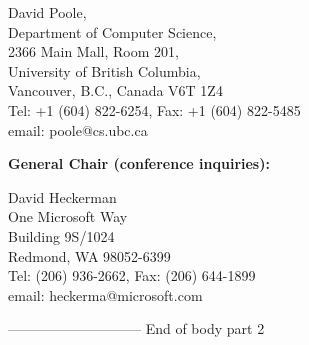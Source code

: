 David Poole,\\
Department of Computer Science,\\
2366 Main Mall, Room 201,\\
University of British Columbia,\\
Vancouver, B.C., Canada V6T 1Z4\\
Tel: +1 (604) 822-6254,
Fax:  +1 (604) 822-5485\\
email: poole@cs.ubc.ca


{\bf General Chair (conference inquiries):}

David Heckerman\\
One Microsoft Way\\
Building 9S/1024\\
Redmond, WA 98052-6399\\
Tel: (206) 936-2662, Fax: (206) 644-1899\\
email: heckerma@microsoft.com




----------------------------- End of body part 2
